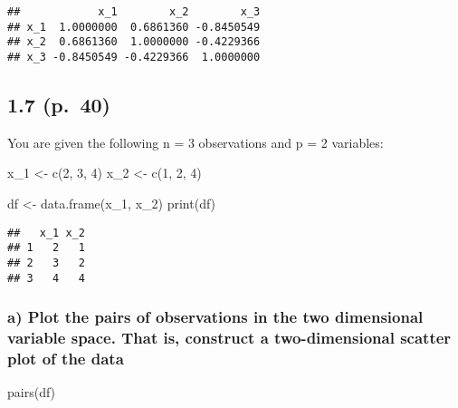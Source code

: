 \documentclass[
]{article}
\newenvironment{Shaded}{\begin{snugshade}}{\end{snugshade}}
\newcommand{\DecValTok}[1]{\textcolor[rgb]{0.00,0.00,0.81}{#1}}
\newcommand{\FunctionTok}[1]{\textcolor[rgb]{0.00,0.00,0.00}{#1}}
\newcommand{\NormalTok}[1]{#1}
\newcommand{\OtherTok}[1]{\textcolor[rgb]{0.56,0.35,0.01}{#1}}
\begin{document}
\begin{verbatim}
##            x_1        x_2        x_3
## x_1  1.0000000  0.6861360 -0.8450549
## x_2  0.6861360  1.0000000 -0.4229366
## x_3 -0.8450549 -0.4229366  1.0000000
\end{verbatim}

\hypertarget{p.-40}{%
\subsection{1.7 (p.~40)}\label{p.-40}}

You are given the following n = 3 observations and p = 2 variables:

\begin{Shaded}
\begin{Highlighting}[]
\NormalTok{x\_1 }\OtherTok{\textless{}{-}} \FunctionTok{c}\NormalTok{(}\DecValTok{2}\NormalTok{, }\DecValTok{3}\NormalTok{, }\DecValTok{4}\NormalTok{)}
\NormalTok{x\_2 }\OtherTok{\textless{}{-}} \FunctionTok{c}\NormalTok{(}\DecValTok{1}\NormalTok{, }\DecValTok{2}\NormalTok{, }\DecValTok{4}\NormalTok{)}

\NormalTok{df }\OtherTok{\textless{}{-}} \FunctionTok{data.frame}\NormalTok{(x\_1,}
\NormalTok{                 x\_2)}
\FunctionTok{print}\NormalTok{(df)}
\end{Highlighting}
\end{Shaded}

\begin{verbatim}
##   x_1 x_2
## 1   2   1
## 2   3   2
## 3   4   4
\end{verbatim}

\hypertarget{a-plot-the-pairs-of-observations-in-the-two-dimensional-variable-space.-that-is-construct-a-two-dimensional-scatter-plot-of-the-data}{%
\subsubsection{a) Plot the pairs of observations in the two dimensional
variable space. That is, construct a two-dimensional scatter plot of the
data}\label{a-plot-the-pairs-of-observations-in-the-two-dimensional-variable-space.-that-is-construct-a-two-dimensional-scatter-plot-of-the-data}}

\begin{Shaded}
\begin{Highlighting}[]
\FunctionTok{pairs}\NormalTok{(df)}
\end{Highlighting}
\end{Shaded}
\end{document}
